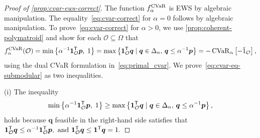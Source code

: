 \begin{proof}[Proof of \cref{prop:cvar-ews-correct}]
The function $f_{\alpha }^{\operatorname{CVaR}}$ is EWS by algebraic manipulation. The equality~\eqref{eq:cvar-correct} for $\alpha = 0$ follows by algebraic manipulation. To prove~\eqref{eq:cvar-correct} for $\alpha > 0$, we use \cref{prop:coherent-polymatroid} and show for each $\mathcal{O} \subseteq \Omega$ that
\begin{equation}
\label{eq:cvar-eq-submodular}
  f_{\alpha}^{\operatorname{CVaR}}(\mathcal{O})
  =
  \min\left\{ \alpha^{-1} \bm{1}_{\mathcal{O}}^{\mathsf{T}} \bm{p},\; 1 \right\}
= \max \left\{ \bm{1}_{\mathcal{O}}^{\mathsf{T}} \bm{q} \mid 
\bm{q} \in \Delta_{n}, \,
\bm{q} \le \alpha^{-1} \bm{p}
\right\}
=
  -\operatorname{CVaR}_{\alpha } \left[- \tilde{1}_{\mathcal{O}}\right],
\end{equation}
using the dual CVaR formulation in~\eqref{eq:primal_cvar}. We prove~\eqref{eq:cvar-eq-submodular} as two inequalities.

(i) The inequality 
\[
\min\left\{ \alpha^{-1} \bm{1}_{\mathcal{O}}^{\mathsf{T}} \bm{p},\; 1 \right\}
\ge \max \left\{ \bm{1}_{\mathcal{O}}^{\mathsf{T}} \bm{q} \mid \bm{q} \in \Delta_{n}, \, \bm{q} \le \alpha^{-1} \bm{p}
\right\},
\]
holds because $\bm{q}$ feasible in the right-hand side satisfies that 
\(  \bm{1}_{\mathcal{O}}^{\mathsf{T}} \bm{q} \le \alpha^{-1} \bm{1}_{\mathcal{O}}^{\mathsf{T}} \bm{p},
 \text{ and }
  \bm{1}_{\mathcal{O}}^{\mathsf{T}} \bm{q} \le \bm{1}^{\mathsf{T}} \bm{q} = 1.
\)


\end{proof}
